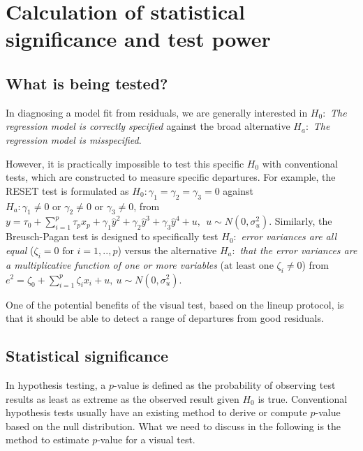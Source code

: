 \documentclass[]{interact}
\theoremstyle{plain}%
\theoremstyle{definition}
\theoremstyle{remark}
\begin{document}
\hypertarget{calculation-of-statistical-significance-and-test-power}{%
\section{Calculation of statistical significance and test
power}\label{calculation-of-statistical-significance-and-test-power}}

\hypertarget{what-is-being-tested}{%
\subsection{What is being tested?}\label{what-is-being-tested}}

In diagnosing a model fit from residuals, we are generally interested in
\(H_0:\) \emph{The regression model is correctly specified} against the
broad alternative \(H_a:\) \emph{The regression model is misspecified}.

However, it is practically impossible to test this specific \(H_0\) with
conventional tests, which are constructed to measure specific
departures. For example, the RESET test is formulated as
\(H_0:\gamma_1 = \gamma_2 = \gamma_3 = 0\) against
\(H_a: \gamma_1 \neq 0 \text{ or } \gamma_2 \neq 0 \text{ or } \gamma_3 \neq 0\),
from
\(y = \tau_0 + \sum_{i=1}^{p}\tau_px_p +\gamma_1\hat{y}^2 + \gamma_2\hat{y}^3 + \gamma_3\hat{y}^4 + u, ~~u \sim N(0, \sigma_u^2)\).
Similarly, the Breusch-Pagan test is designed to specifically test
\(H_0:\) \emph{error variances are all equal}
(\(\zeta_i=0 \text{ for } i=1,..,p\)) versus the alternative \(H_a:\)
\emph{that the error variances are a multiplicative function of one or
more variables} (\(\text{at least one } \zeta_i\neq 0\)) from
\(e^2 = \zeta_0 + \sum_{i=1}^{p}\zeta_i x_i + u, ~ u\sim N(0,\sigma_u^2)\).

One of the potential benefits of the visual test, based on the lineup
protocol, is that it should be able to detect a range of departures from
good residuals.

\hypertarget{statistical-significance}{%
\subsection{Statistical significance}\label{statistical-significance}}

In hypothesis testing, a \(p\)-value is defined as the probability of
observing test results as least as extreme as the observed result given
\(H_0\) is true. Conventional hypothesis tests usually have an existing
method to derive or compute \(p\)-value based on the null distribution.
What we need to discuss in the following is the method to estimate
\(p\)-value for a visual test.
\end{document}
